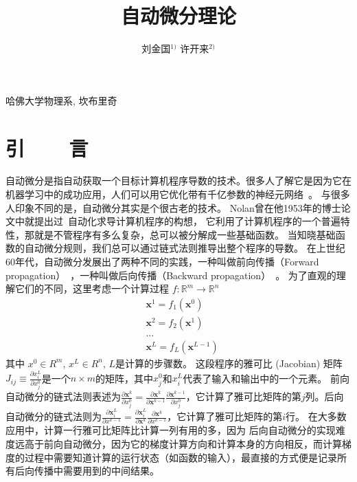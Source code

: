 \documentclass[A4,twoside,fontset=ubuntu,UTF8]{ctexart}
\newcommand{\vx}{{\mathbf{x}}}
\begin{document}
\apsname

\title{自动微分理论 \fivestar}%

\author{刘金国$^{1)}$ \quad 许开来$^{2)}$}

\address{1)}{哈佛大学物理系, 坎布里奇 }





\cfund{}




{}\baselineskip
\section{引~~~~言}
    自动微分是指自动获取一个目标计算机程序导数的技术。很多人了解它是因为它在机器学习中的成功应用，人们可以用它优化带有千亿参数的神经元网络~\cite{Rosset2019}。
与很多人印象不同的是，自动微分其实是个很古老的技术。
Nolan曾在他1953年的博士论文中就提出过~\cite{Nolan1953}自动化求导计算机程序的构想，
它利用了计算机程序的一个普遍特性，那就是不管程序有多么复杂，总可以被分解成一些基础函数。
当知晓基础函数的自动微分规则，我们总可以通过链式法则推导出整个程序的导数。
    在上世纪60年代，自动微分发展出了两种不同的实践，一种叫做前向传播（Forward propagation）~\cite{Wengert1964}，一种叫做后向传播（Backward propagation）~\cite{Boltyanski1960}。
为了直观的理解它们的不同，这里考虑一个计算过程 $f : \mathbb{R}^m \rightarrow \mathbb{R}^n$
\begin{align*}
    &\vx^1 = f_1(\vx^0)\\
    &\vx^2 = f_2(\vx^1)\\
    &\ldots\\
    &\vx^L = f_L(\vx^{L-1})
\end{align*}
其中 $x^0\in R^m$, $x^L\in R^n$, $L$是计算的步骤数。
这段程序的雅可比 (Jacobian) 矩阵$J_{ij} \equiv \frac{\partial x^L_i}{\partial x_j^0}$是一个$n\times m$的矩阵，其中$x_j^0$和$x_i^L$代表了输入和输出中的一个元素。
前向自动微分的链式法则表述为$\frac{\partial \vx^k}{\partial x^0_j} = \frac{\partial \vx^k}{\partial \vx^{k-1}}\frac{\partial \vx^{k-1}}{\partial x^0_j}$，它计算了雅可比矩阵的第$j$列。后向自动微分的链式法则为$\frac{\partial \vx^L_i}{\partial x^{k-1}} = \frac{\partial \vx^L_i}{\partial \vx^{k}}\frac{\partial \vx^{k}}{\partial x^{k-1}}$，它计算了雅可比矩阵的第$i$行。
在大多数应用中，计算一行雅可比矩阵比计算一列有用的多，因为
后向自动微分的实现难度远高于前向自动微分，因为它的梯度计算方向和计算本身的方向相反，而计算梯度的过程中需要知道计算的运行状态（如函数的输入），最直接的方式便是记录所有后向传播中需要用到的中间结果。
\end{document}
